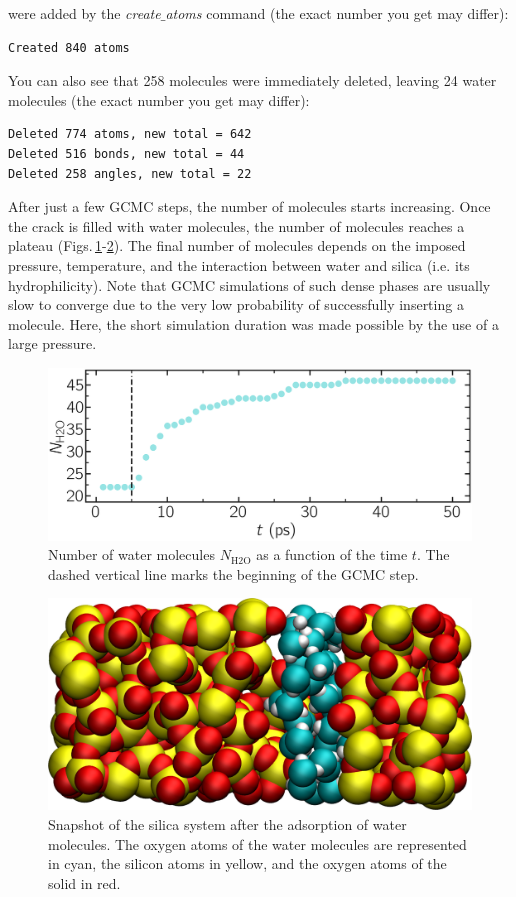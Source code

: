 \documentclass[9pt,tutorial]{livecoms}
\begin{document}
were added by the \textit{create$\_$atoms} command (the exact number you get may differ):
{\normalsize \begin{verbatim}
Created 840 atoms
\end{verbatim}}
You can also see that 258 molecules were immediately deleted, leaving 24 water molecules (the exact number you get may differ):
{\normalsize \begin{verbatim}
Deleted 774 atoms, new total = 642
Deleted 516 bonds, new total = 44
Deleted 258 angles, new total = 22
\end{verbatim}}
After just a few GCMC steps, the number of molecules starts increasing. Once the crack is filled with water molecules, the number of molecules reaches a plateau (Figs.\,\ref{fig:GCMC-number}-\ref{fig:GCMC-solvated}). The final number of molecules depends on the imposed pressure, temperature, and the interaction between water and silica (i.e. its hydrophilicity). Note that GCMC simulations of such dense phases are usually slow to converge due to the
very low probability of successfully inserting a molecule. Here, the short simulation 
duration was made possible by the use of a large pressure.

\begin{figure}
\centering
\includegraphics[width=\linewidth]{GCMC-number}
\caption{Number of water molecules $N_\text{H2O}$ as a function of the time $t$. The dashed vertical line marks the beginning of the GCMC step.}
\label{fig:GCMC-number}
\end{figure}

\begin{figure}
\centering
\includegraphics[width=\linewidth]{GCMC-solvated}
\caption{Snapshot of the silica system after the adsorption of water molecules. The oxygen atoms of the water molecules are represented in cyan, the silicon atoms in yellow, and the oxygen atoms of the solid in red.}
\label{fig:GCMC-solvated}
\end{figure}
\end{document}
